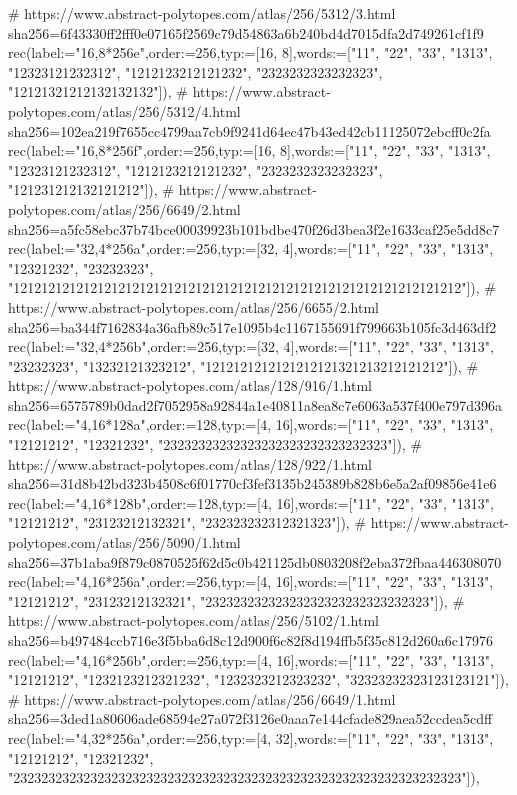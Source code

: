 \documentclass[11pt,a4paper]{article}
\begin{document}
\begin{CompleteProgram}
# https://www.abstract-polytopes.com/atlas/256/5312/3.html sha256=6f43330ff2fff0e07165f2569c79d54863a6b240bd4d7015dfa2d749261cf1f9
rec(label:="{16,8}*256e",order:=256,typ:=[16, 8],words:=["11", "22", "33", "1313", "12323121232312", "1212123212121232", "2323232323232323", "12121321212132132132"]),
# https://www.abstract-polytopes.com/atlas/256/5312/4.html sha256=102ea219f7655cc4799aa7cb9f9241d64ec47b43ed42cb11125072ebcff0c2fa
rec(label:="{16,8}*256f",order:=256,typ:=[16, 8],words:=["11", "22", "33", "1313", "12323121232312", "1212123212121232", "2323232323232323", "121231212132121212"]),
# https://www.abstract-polytopes.com/atlas/256/6649/2.html sha256=a5fc58ebc37b74bce00039923b101bdbe470f26d3bea3f2e1633caf25e5dd8c7
rec(label:="{32,4}*256a",order:=256,typ:=[32, 4],words:=["11", "22", "33", "1313", "12321232", "23232323", "1212121212121212121212121212121212121212121212121212121212121212"]),
# https://www.abstract-polytopes.com/atlas/256/6655/2.html sha256=ba344f7162834a36afb89c517e1095b4c1167155691f799663b105fc3d463df2
rec(label:="{32,4}*256b",order:=256,typ:=[32, 4],words:=["11", "22", "33", "1313", "23232323", "13232121323212", "1212121212121212121321213212121212"]),
# https://www.abstract-polytopes.com/atlas/128/916/1.html sha256=6575789b0dad2f7052958a92844a1e40811a8ea8c7e6063a537f400e797d396a
rec(label:="{4,16}*128a",order:=128,typ:=[4, 16],words:=["11", "22", "33", "1313", "12121212", "12321232", "23232323232323232323232323232323"]),
# https://www.abstract-polytopes.com/atlas/128/922/1.html sha256=31d8b42bd323b4508c6f01770cf3fef3135b245389b828b6e5a2af09856e41e6
rec(label:="{4,16}*128b",order:=128,typ:=[4, 16],words:=["11", "22", "33", "1313", "12121212", "23123212132321", "232323232312321323"]),
# https://www.abstract-polytopes.com/atlas/256/5090/1.html sha256=37b1aba9f879c0870525f62d5c0b421125db0803208f2eba372fbaa446308070
rec(label:="{4,16}*256a",order:=256,typ:=[4, 16],words:=["11", "22", "33", "1313", "12121212", "23123212132321", "23232323232323232323232323232323"]),
# https://www.abstract-polytopes.com/atlas/256/5102/1.html sha256=b497484ccb716e3f5bba6d8c12d900f6c82f8d194ffb5f35c812d260a6c17976
rec(label:="{4,16}*256b",order:=256,typ:=[4, 16],words:=["11", "22", "33", "1313", "12121212", "1232123212321232", "1232323212323232", "32323232323123123121"]),
# https://www.abstract-polytopes.com/atlas/256/6649/1.html sha256=3ded1a80606ade68594e27a072f3126e0aaa7e144cfade829aea52ccdea5cdff
rec(label:="{4,32}*256a",order:=256,typ:=[4, 32],words:=["11", "22", "33", "1313", "12121212", "12321232", "2323232323232323232323232323232323232323232323232323232323232323"]),

\end{CompleteProgram}
\end{document}
